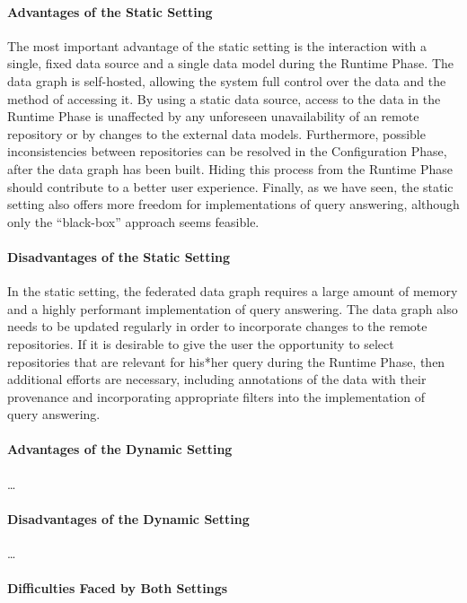 \paragraph{Advantages of the Static Setting}

The most important advantage of the static setting is the interaction with a single, fixed data source
and a single data model during the Runtime Phase.
The data graph is self-hosted, allowing the system full control over the data
and the method of accessing it.
By using a static data source, access to the data in the Runtime Phase is
unaffected by any unforeseen unavailability of an remote repository
or by changes to the external data models.
Furthermore, possible inconsistencies between repositories
can be resolved in the Configuration Phase, after the data graph has been built. Hiding this process from the Runtime Phase
should contribute to a better user experience.
Finally, as we have seen, the static setting also offers more freedom for implementations of
query answering, although only the \enquote{black-box} approach seems feasible.

\paragraph{Disadvantages of the Static Setting}

In the static setting, the federated data graph requires a large amount of memory
and a highly performant implementation of query answering.
The data graph also needs to be updated regularly in order to incorporate changes
to the remote repositories.
If it is desirable to give the user the opportunity to select repositories 
that are relevant for his*her query during the Runtime Phase, 
then additional efforts are necessary, including annotations of the data
with their provenance and incorporating appropriate filters into the implementation
of query answering.

\paragraph{Advantages of the Dynamic Setting}

\dots

\paragraph{Disadvantages of the Dynamic Setting}

\dots

\paragraph{Difficulties Faced by Both Settings}

